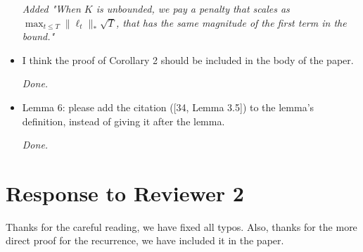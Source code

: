\documentclass{article}
\begin{document}
\begin{itemize}
\emph{Added "When $K$ is unbounded, we pay a penalty that scales as $\max_{t \le T}
\|\ell_t\|_* \sqrt{T}$, that has the same magnitude of the first term in the
bound."}

\item I think the proof of Corollary 2 should be included in the body of the paper.

\emph{Done.}

\item Lemma 6: please add the citation ([34, Lemma 3.5]) to the lemma's definition, instead of giving it after the lemma. 

\emph{Done.}

\end{itemize}

\section{Response to Reviewer 2}

Thanks for the careful reading, we have fixed all typos. Also, thanks for the more direct proof for the recurrence, we
have included it in the paper.
\end{document}
